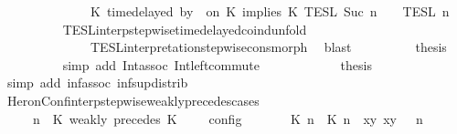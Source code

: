 \begin{isabellebody}
\ \ \ \ \ \ \ \ \ \ \ \ {\isasyminter}\ {\isasymlbrakk}\ K\ time{\isacharminus}delayed\ by\ {\isasymdelta}{\isasymtau}\ on\ K\ implies\ K\ {\isasymrbrakk}\isactrlsub T\isactrlsub E\isactrlsub S\isactrlsub L\isactrlbsup {\isasymge}\ Suc\ n\isactrlesup \ {\isasyminter}\ {\isasymlbrakk}{\isasymlbrakk}\ {\isasymPsi}\ {\isasymrbrakk}{\isasymrbrakk}\isactrlsub T\isactrlsub E\isactrlsub S\isactrlsub L\isactrlbsup {\isasymge}\ n\isactrlesup {\isacartoucheclose}\isanewline
\ \ \ \ \ \ \ \ \isamarkupfalse%
\ TESL{\isacharunderscore}interp{\isacharunderscore}stepwise{\isacharunderscore}timedelayed{\isacharunderscore}coind{\isacharunderscore}unfold\isanewline
\ \ \ \ \ \ \ \ \ \ \ \ \ \ TESL{\isacharunderscore}interpretation{\isacharunderscore}stepwise{\isacharunderscore}cons{\isacharunderscore}morph\ \isamarkupfalse%
\ blast\isanewline
\ \ \ \ \ \ \isamarkupfalse%
\ \isamarkupfalse%
\ {\isacharquery}thesis\isanewline
\ \ \ \ \ \ \ \ \isamarkupfalse%
\ {\isacharparenleft}simp\ add{\isacharcolon}\ Int{\isacharunderscore}assoc\ Int{\isacharunderscore}left{\isacharunderscore}commute{\isacharparenright}\isanewline
\ \ \ \ \isamarkupfalse%
\isanewline
\ \ \ \ \isamarkupfalse%
\ \isamarkupfalse%
\ {\isacharquery}thesis\ \isamarkupfalse%
\ {\isacharparenleft}simp\ add{\isacharcolon}\ inf{\isacharunderscore}assoc\ inf{\isacharunderscore}sup{\isacharunderscore}distrib{}{\isacharparenright}\isanewline
\ \ \isamarkupfalse%
\isanewline
{}\isamarkupfalse%
%
\endisatagproof
{\isafoldproof}%
%
\isadelimproof
\isanewline
%
\endisadelimproof
\isanewline
{}\isamarkupfalse%
\ HeronConf{\isacharunderscore}interp{\isacharunderscore}stepwise{\isacharunderscore}weakly{\isacharunderscore}precedes{\isacharunderscore}cases{\isacharcolon}\isanewline
\ \ \ {\isacartoucheopen}{\isasymlbrakk}\ {\isasymGamma}{\isacharcomma}\ n\ {\isasymturnstile}\ {\isacharparenleft}{\isacharparenleft}K\ weakly\ precedes\ K\ {\isacharhash}\ {\isasymPsi}{\isacharparenright}\ {\isasymtriangleright}\ {\isasymPhi}\ {\isasymrbrakk}\isactrlsub c\isactrlsub o\isactrlsub n\isactrlsub f\isactrlsub i\isactrlsub g\isanewline
\ \ \ \ {\isacharequal}\ {\isasymlbrakk}\ {\isacharparenleft}{\isacharparenleft}{\isasymlceil}{\isacharhash}\isactrlsup {\isasymle}\ K\ n{\isacharcomma}\ {\isacharhash}\isactrlsup {\isasymle}\ K\ n{\isasymrceil}\ {\isasymin}\ {\isacharparenleft}{\isasymlambda}{\isacharparenleft}x{\isacharcomma}y{\isacharparenright}{\isachardot}\ x{\isasymle}y{\isacharparenright}{\isacharparenright}\ {\isacharhash}\ {\isasymGamma}{\isacharparenright}{\isacharcomma}\ n\isanewline

\end{isabellebody}
